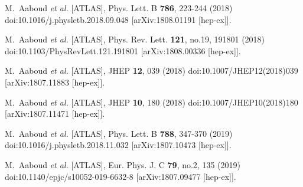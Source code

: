 \begin{thebibliography}{9}
M.~Aaboud \textit{et al.} [ATLAS],
Phys. Lett. B \textbf{786}, 223-244 (2018)
doi:10.1016/j.physletb.2018.09.048
[arXiv:1808.01191 [hep-ex]].

M.~Aaboud \textit{et al.} [ATLAS],
Phys. Rev. Lett. \textbf{121}, no.19, 191801 (2018)
doi:10.1103/PhysRevLett.121.191801
[arXiv:1808.00336 [hep-ex]].

M.~Aaboud \textit{et al.} [ATLAS],
JHEP \textbf{12}, 039 (2018)
doi:10.1007/JHEP12(2018)039
[arXiv:1807.11883 [hep-ex]].

M.~Aaboud \textit{et al.} [ATLAS],
JHEP \textbf{10}, 180 (2018)
doi:10.1007/JHEP10(2018)180
[arXiv:1807.11471 [hep-ex]].

M.~Aaboud \textit{et al.} [ATLAS],
Phys. Lett. B \textbf{788}, 347-370 (2019)
doi:10.1016/j.physletb.2018.11.032
[arXiv:1807.10473 [hep-ex]].

M.~Aaboud \textit{et al.} [ATLAS],
Eur. Phys. J. C \textbf{79}, no.2, 135 (2019)
doi:10.1140/epjc/s10052-019-6632-8
[arXiv:1807.09477 [hep-ex]].


\end{thebibliography}
